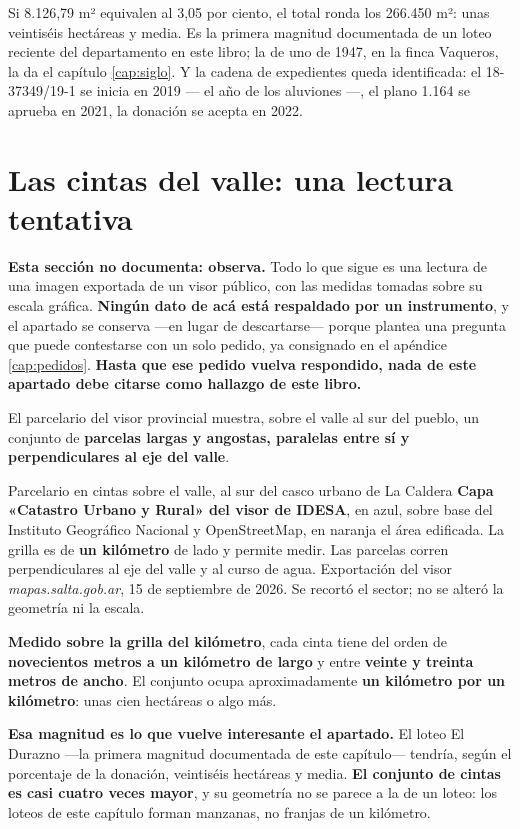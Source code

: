 Si 8.126,79 m² equivalen al 3,05 por ciento, el total ronda los 266.450 m²: unas veintiséis hectáreas y media. Es la primera magnitud documentada de un loteo reciente del departamento en este libro; la de uno de 1947, en la finca Vaqueros, la da el capítulo \ref{cap:siglo}. Y la cadena de expedientes queda identificada: el 18-37349/19-1 se inicia en 2019 --- el año de los aluviones ---, el plano 1.164 se aprueba en 2021, la donación se acepta en 2022.

\section{Las cintas del valle: una lectura tentativa}

\begin{cautela}
\textbf{Esta sección no documenta: observa.} Todo lo que sigue es una lectura de una imagen
exportada de un visor público, con las medidas tomadas sobre su escala gráfica.
\textbf{Ningún dato de acá está respaldado por un instrumento}, y el apartado se conserva
---en lugar de descartarse--- porque plantea una pregunta que puede contestarse con un solo
pedido, ya consignado en el apéndice \ref{cap:pedidos}. \textbf{Hasta que ese pedido vuelva
respondido, nada de este apartado debe citarse como hallazgo de este libro.}
\end{cautela}

El parcelario del visor provincial muestra, sobre el valle al sur del pueblo, un conjunto de
\textbf{parcelas largas y angostas, paralelas entre sí y perpendiculares al eje del valle}.

%
{Parcelario en cintas sobre el valle, al sur del casco urbano de La Caldera}%
{\textbf{Capa «Catastro Urbano y Rural» del visor de IDESA}, en azul, sobre base del Instituto
Geográfico Nacional y OpenStreetMap, en naranja el área edificada. La grilla es de
\textbf{un kilómetro} de lado y permite medir. Las parcelas corren perpendiculares al eje del
valle y al curso de agua.}%
{Exportación del visor \textit{mapas.salta.gob.ar}, 15 de septiembre de 2026. Se recortó el
sector; no se alteró la geometría ni la escala.}

\textbf{Medido sobre la grilla del kilómetro}, cada cinta tiene del orden de
\textbf{novecientos metros a un kilómetro de largo} y entre \textbf{veinte y treinta metros de
ancho}. El conjunto ocupa aproximadamente \textbf{un kilómetro por un kilómetro}: unas cien
hectáreas o algo más.

\textbf{Esa magnitud es lo que vuelve interesante el apartado.} El loteo El Durazno ---la primera
magnitud documentada de este capítulo--- tendría, según el porcentaje de la donación, veintiséis hectáreas y media. \textbf{El conjunto
de cintas es casi cuatro veces mayor}, y su geometría no se parece a la de un loteo: los loteos
de este capítulo forman manzanas, no franjas de un kilómetro.

